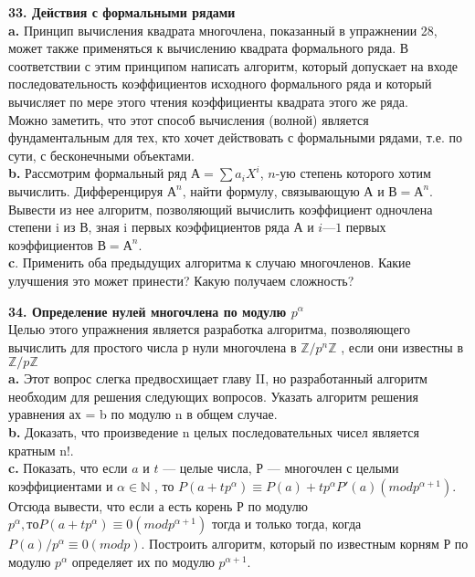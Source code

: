 \noindent
\textbf{33. Действия с формальными рядами}\\

\textbf{a.} Принцип вычисления квадрата многочлена, показанный в упражнении 28, может также применяться к вычислению квадрата формального ряда. В соответствии с этим принципом написать алгоритм, который допускает на входе последовательность коэффициентов исходного формального ряда и который вычисляет по мере этого чтения коэффициенты квадрата этого же ряда.\\

Можно заметить, что этот способ вычисления (волной) является фундаментальным для тех, кто хочет действовать с формальными рядами, т.е. по сути, с бесконечными объектами.\\
\textbf{b.} Рассмотрим формальный ряд $А = \sum a_{i} X^{i}$, $n$-ую степень которого
хотим вычислить. Дифференцируя $А^{n}$, найти формулу, связывающую А и $В = А^{n}$. Вывести из нее алгоритм, позволяющий вычислить коэффициент одночлена степени i из В, зная i первых коэффициентов ряда А и $i — 1$ первых коэффициентов $В = А^{n}$.\\

\textbf{c}. Применить оба предыдущих алгоритма к случаю многочленов. Какие улучшения это может принести? Какую получаем сложность?
\newpage

\noindent
\textbf{34. Определение нулей многочлена по модулю $p^{\alpha}$ }\\

Целью этого упражнения является разработка алгоритма, позволяющего вычислить для простого числа р нули многочлена в $\mathbb{Z} / p^{n} \mathbb{Z}$ , если они известны в $\mathbb{Z} / p \mathbb{Z}$\\

\textbf{a.} Этот вопрос слегка предвосхищает главу II, но разработанный алгоритм необходим для решения следующих вопросов. Указать алгоритм решения уравнения ах = b по модулю n в общем случае.\\

\textbf{b.} Доказать, что произведение n целых последовательных чисел является кратным n!.\\

\textbf{c.} Показать, что если $a$ и $t$ — целые числа, Р — многочлен с целыми коэффициентами и $\alpha \in \mathbb{N}$ , то $P(a + tp^{\alpha}) \equiv P(a) + tp^{\alpha} P'(a) (mod p^{\alpha + 1})$. Отсюда вывести, что если а есть корень Р по модулю $p^{\alpha}, то P(a + tp^{\alpha}) \equiv 0 (mod p^{\alpha + 1})$ тогда и только тогда, когда $P(a)/p^{\alpha} \equiv 0 (mod p)$. Построить алгоритм, который по известным корням Р по модулю $p^{\alpha}$ определяет их по модулю $p^{\alpha + 1}$.\\

